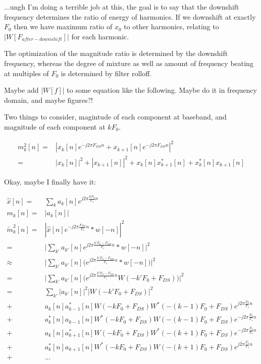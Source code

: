\documentclass [11pt, proquest] {uwthesis}[2015/03/03]
\begin{document}
...ungh I'm doing a terrible job at this, the goal is to say that the downshift frequency determines the ratio of energy of harmonics.  If we downshift at exactly $F_0$ then we have maximum ratio of $x_0$ to other harmonics, relating to $|W[F_{after-downshift}]|$ for each harmonic.

The optimization of the magnitude ratio is determined by the downshift frequency, whereas the degree of mixture as well as amount of frequency beating at multiples of $F_0$ is determined by filter rolloff.

Maybe add $|W[f]|$ to some equation like the following.  Maybe do it in frequency domain, and maybe figures?!

Two things to consider, magintude of each component at baseband, and magnitude of each component at $k F_0$.

\begin{align}
m_k^2[n] =& | x_k[n] e^{-j2\pi F_{DS} n} +  x_{k+1}[n] e^{-j2\pi F_{DS} n}|^2 \nonumber \\
=& | x_k[n] |^2 + | x_{k+1}[n] |^2 + x_k[n]x_{k+1}^*[n]  + x_k^*[n]x_{k+1}[n]
\end{align}



Okay, maybe I finally have it:


\begin{align}
\widehat{x}[n] =& \sum_k a_k[n] e^{j2\pi \frac{kF_0}{F_s} n} \\
m_k[n] =& | a_k[n]| \\
\tilde{m}_k^2[n] =&  | \widehat{x}[n] e^{-j2\pi \frac{F_{DS}}{F_s} n} * w[-n] |^2 \nonumber \\
=& \Big| \sum_{k'} a_{k'}[n] e^{j2\pi \frac{k'F_0 - F_{DS}}{F_s} n}* w[-n] \Big|^2 \nonumber \\
\approx& \Big| \sum_{k'} a_{k'}[n] \Big( e^{j2\pi \frac{k'F_0 - F_{DS}}{F_s} n}* w[-n] \Big) \Big|^2 \nonumber \\
=& \Big| \sum_{k'} a_{k'}[n] \Big( e^{j2\pi \frac{k'F_0 - F_{DS}}{F_s} n} W(-k'F_0 + F_{DS}) \Big) \Big|^2 \nonumber \\
=& \sum_{k'} | a_{k'}[n]|^2 |W(-k'F_0 + F_{DS})|^2 \\
+& a_k[n]a_{k-1}^*[n]W(-kF_0 + F_{DS})W^*(-(k-1)F_0 + F_{DS}) e^{j2\pi \frac{F_0}{F_s} n} \nonumber \\
+& a_k^*[n]a_{k-1}[n]W^*(-kF_0 + F_{DS})W(-(k-1)F_0 + F_{DS}) e^{-j2\pi \frac{F_0}{F_s} n}\nonumber \\
+& a_k[n]a_{k+1}^*[n]W(-kF_0 + F_{DS})W^*(-(k+1)F_0 + F_{DS})e^{-j2\pi \frac{F_0}{F_s} n} \nonumber \\
+& a_k^*[n]a_{k+1}[n]W^*(-kF_0 + F_{DS})W(-(k+1)F_0 + F_{DS})e^{j2\pi \frac{F_0}{F_s} n} \nonumber \\
+& ...
\end{align}
\end{document}
